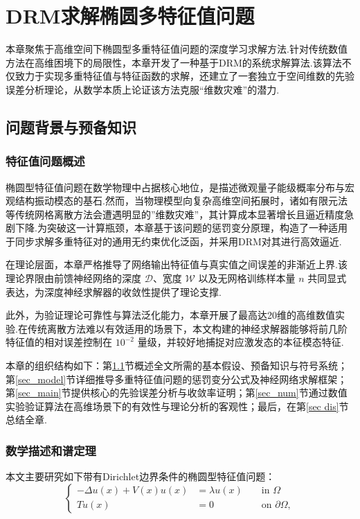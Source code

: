 \chapter{DRM求解椭圆多特征值问题}\label{chap:eigen}
本章聚焦于高维空间下椭圆型多重特征值问题的深度学习求解方法.针对传统数值方法在高维困境下的局限性，本章开发了一种基于DRM的系统求解算法.该算法不仅致力于实现多重特征值与特征函数的求解，还建立了一套独立于空间维数的先验误差分析理论，从数学本质上论证该方法克服“维数灾难”的潜力.
\section{问题背景与预备知识}\label{sec_pre}
\subsection{特征值问题概述}
椭圆型特征值问题在数学物理中占据核心地位，是描述微观量子能级概率分布与宏观结构振动模态的基石.然而，当物理模型向复杂高维空间拓展时，诸如有限元法等传统网格离散方法会遭遇明显的”维数灾难”，其计算成本显著增长且逼近精度急剧下降.为突破这一计算瓶颈，本章基于该问题的惩罚变分原理，构造了一种适用于同步求解多重特征对的通用无约束优化泛函，并采用DRM对其进行高效逼近.

在理论层面，本章严格推导了网络输出特征值与真实值之间误差的非渐近上界.该理论界限由前馈神经网络的深度 $\mathcal{D}$、宽度 $\mathcal{W}$ 以及无网格训练样本量 $n$ 共同显式表达，为深度神经求解器的收敛性提供了理论支撑.

此外，为验证理论可靠性与算法泛化能力，本章开展了最高达20维的高维数值实验.在传统离散方法难以有效适用的场景下，本文构建的神经求解器能够将前几阶特征值的相对误差控制在 $10^{-2}$ 量级，并较好地捕捉对应激发态的本征模态特征.

本章的组织结构如下：第\ref{sec_pre}节概述全文所需的基本假设、预备知识与符号系统；第\ref{sec_model}节详细推导多重特征值问题的惩罚变分公式及神经网络求解框架；第\ref{sec_main}节提供核心的先验误差分析与收敛率证明；第\ref{sec_num}节通过数值实验验证算法在高维场景下的有效性与理论分析的客观性；最后，在第\ref{sec dis}节总结全章.
\subsection{数学描述和谱定理}
本文主要研究如下带有Dirichlet边界条件的椭圆型特征值问题：
\begin{equation}\label{eq:eigendiriproblem}
\left\{\begin{aligned}
-\Delta u(x)+V(x) u(x) &=\lambda u(x) & & \text { in } \Omega \\
T u(x) &=0 & & \text { on } \partial \Omega,
\end{aligned}\right.
\end{equation}

